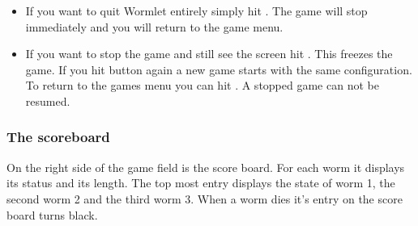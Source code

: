 \begin{description}
\begin{itemize}
\item If you want to quit Wormlet entirely simply hit
.
The game will stop immediately and you will return to the game menu. 
\item If you want to stop the game and still see the screen hit 
.
This freezes the game. If you hit
button again a new game starts with the same configuration. To return to the
games menu you can hit
. A stopped game can not be resumed. 
\end{itemize}
\end{description}

\subsubsection{The scoreboard}
On the right side of the game field is the score board. For each worm it
displays its status and its length. The top most entry displays the
state of worm 1, the second worm 2 and the third worm 3. When a worm
dies it's entry on the score board turns black.

